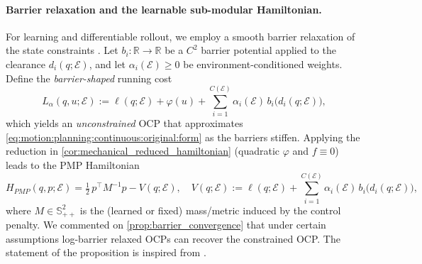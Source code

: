\paragraph{Barrier relaxation and the learnable {sub-modular} Hamiltonian.}
For learning and differentiable rollout, we employ a smooth barrier relaxation of the state constraints \citep{NocedalWright2006NumericalOptimization}.
Let $b_i:\mathbb R\to\mathbb R$ be a $C^2$ barrier potential applied to the clearance $d_i(q;\mathcal E)$, and let
$\alpha_i(\mathcal E)\ge 0$ be environment-conditioned weights.
Define the \emph{barrier-shaped} running cost
\begin{equation}
\label{eq:barrier_shaped_cost}
L_{\alpha}(q,u;\mathcal E)
:=\ell(q;\mathcal E)+\varphi(u)+\sum_{i=1}^{C(\mathcal E)} \alpha_i(\mathcal E)\, b_i\!\big(d_i(q;\mathcal E)\big),
\end{equation}
which yields an \emph{unconstrained} OCP that approximates \cref{eq:motion:planning:continuous:original:form} as the barriers stiffen.
Applying the reduction in \cref{cor:mechanical_reduced_hamiltonian} (quadratic $\varphi$ and $f\equiv 0$)
leads to the PMP Hamiltonian
\begin{equation}
\label{eq:def:pmp:hamiltonian:grl-snam}
H_{PMP}(q,p;\mathcal E)
=\tfrac12\,p^\top M^{-1}p- V(q;\mathcal E),
\quad
V(q;\mathcal E)
:= \ell(q;\mathcal E)+\sum_{i=1}^{C(\mathcal E)} \alpha_i(\mathcal E)\, b_i\!\big(d_i(q;\mathcal E)\big),
\end{equation}
where $M\in\mathbb S_{++}^2$ is the (learned or fixed) mass/metric induced by the control penalty. We commented on \cref{prop:barrier_convergence} that under certain assumptions log-barrier relaxed OCPs can recover the constrained OCP. The statement of the proposition is inspired from \citet{malisani2023interior}.


